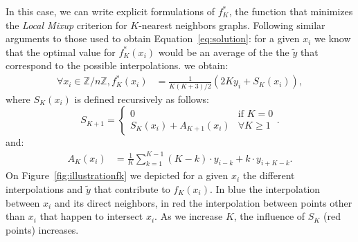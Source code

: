 \documentclass[twoside]{article}
\numberwithin{intassumption}{assumption}
\begin{document}
In this case, we can write explicit formulations of $f^*_{K}$, the function that minimizes the \emph{Local Mixup} criterion for $K$-nearest neighbors graphs. Following similar arguments to those used to obtain Equation~\eqref{eq:solution}: for a given $x_i$ we know that the optimal value for $f^*_K(x_i)$ would be an average of the the $\tilde y$ that correspond to the possible interpolations.
we obtain:
\begin{align}
    \forall x_i \in \mathbb{Z}/n\mathbb{Z}, f^*_K(x_i) &= \frac{1}{K(K+3)/2}(2 K y_i +S_K(x_i)) \label{eq:fkmixup},
\end{align} 
where $S_K(x_i)$ is defined recursively as follows:
\begin{equation}
    S_{K+1} = \left\{\begin{array}{ll}0& \text{if } K = 0\\S_{K}(x_i) + A_{K+1}(x_i)& \forall K \geq 1 \end{array}\right..
    \label{eq:skexpression}
\end{equation}
and:
\begin{align*}
A_K(x_i) &= \frac{1}{K} \sum_{k=1}^{K-1} (K-k)\cdot y_{i-k} + k\cdot y_{i+K-k}.
\end{align*}
On Figure~\ref{fig:illustrationfk} we depicted for a given $x_i$ the different interpolations and $\tilde y$ that contribute to $f_K(x_i)$. In blue the interpolation between $x_i$ and its direct neighbors, in red the interpolation between points other than $x_i$ that happen to intersect $x_i$. As we increase $K$, the influence of $S_K$ (red points) increases. 
\end{document}
